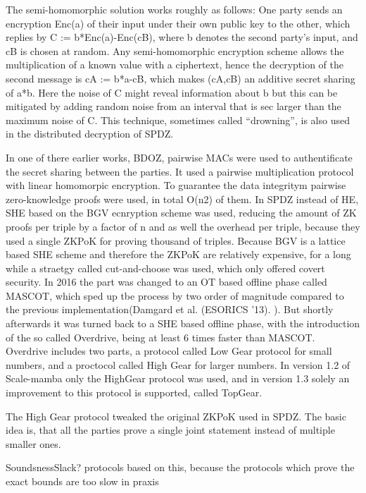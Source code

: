 \documentclass[english,runningheads,a4paper]{llncs}[2018/03/10]
\begin{document}
The semi-homomorphic solution works roughly as follows: One party sends an encryption Enc(a) of their input under their own public key to the other, which replies by C := b*Enc(a)-Enc(cB), where b denotes the second party’s input, and cB is chosen at random. Any semi-homomorphic encryption scheme allows the multiplication of a known value with a ciphertext, hence the decryption of the second message is cA := b*a-cB, which makes (cA,cB) an additive secret sharing of a*b. Here the noise of C might reveal information about b but this can be mitigated by adding random noise from an interval that is sec larger than the maximum noise of C. This technique, sometimes called “drowning”, is also used in the distributed decryption of SPDZ. 



In one of there earlier works, BDOZ, pairwise MACs were used to authentificate the secret sharing between the parties. It used a pairwise multiplication protocol with linear homomorpic encryption. To guarantee the data integritym pairwise zero-knowledge proofs were used, in total O(n2) of them. 
In SPDZ instead of HE, SHE based on the BGV ecnryption scheme was used, reducing the amount of ZK proofs per triple by a factor of n and as well the overhead per triple, because they used a single ZKPoK for proving thousand of triples.
Because BGV is a lattice based SHE scheme and therefore the ZKPoK are relatively expensive, for a long while a straetgy called cut-and-choose was used, which only offered covert security. 
In 2016 the part was changed to an OT based offline phase called MASCOT, which sped up tbe process by two order of magnitude compared to the previous implementation(Damgard et al. (ESORICS ’13). ).
But shortly afterwards it was turned back to a SHE based offline phase, with the introduction of the so called Overdrive, being at least 6 times faster than MASCOT. Overdrive includes two parts, a protocol called Low Gear protocol for small numbers, and a proctocol called High Gear for larger numbers. In version 1.2 of Scale-mamba only the HighGear protocol was used, and in version 1.3 solely an improvement to this protocol is supported, called TopGear.




The High Gear protocol tweaked the original ZKPoK used in SPDZ. The basic idea is, that all the parties prove a single joint statement instead of multiple smaller ones.

SoundsnessSlack? protocols based on this, because the protocols which prove the exact bounds are too slow in praxis
\end{document}
